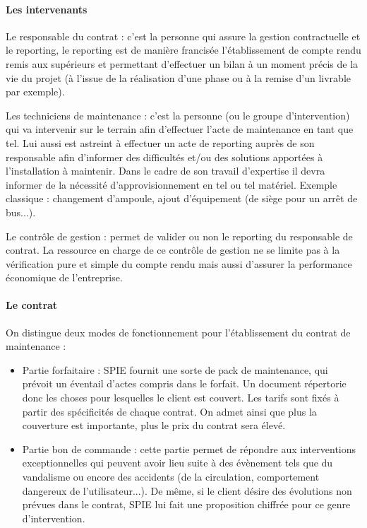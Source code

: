 \paragraph{Les intervenants}
\item Le responsable du contrat : c’est la personne qui assure la gestion contractuelle et le reporting, le reporting est de manière francisée l’établissement de compte rendu remis aux supérieurs et permettant d’effectuer un bilan à un moment précis de la vie du projet (à l’issue de la réalisation d’une phase ou à la remise d’un livrable par exemple).
\item Les techniciens de maintenance : c’est la personne (ou le groupe d’intervention) qui va intervenir sur le terrain afin d'effectuer l’acte de maintenance en tant que tel. Lui aussi est astreint à effectuer un acte de reporting auprès de son responsable afin d’informer des difficultés et/ou des solutions apportées à l’installation à maintenir. Dans le cadre de son travail d’expertise il devra informer de la nécessité d’approvisionnement en tel ou tel matériel. Exemple classique : changement d’ampoule, ajout d'équipement (de siège pour un arrêt de bus...).
\item Le contrôle de gestion : permet de valider ou non le reporting du responsable de contrat. La ressource en charge de ce contrôle de gestion ne se limite pas à la vérification pure et simple du compte rendu mais aussi d’assurer la performance économique de l’entreprise.

\paragraph{Le contrat}

On distingue deux modes de fonctionnement pour l’établissement du contrat de maintenance :

\begin{itemize}
\item Partie forfaitaire : SPIE fournit une sorte de pack de maintenance, qui prévoit un éventail d’actes compris dans le forfait. Un document répertorie donc les choses pour lesquelles le client est couvert. Les tarifs sont fixés à partir des spécificités de chaque contrat. On admet ainsi que plus la couverture est importante, plus le prix du contrat sera élevé. 
\item Partie bon de commande : cette partie permet de répondre aux interventions exceptionnelles qui peuvent avoir lieu suite à des évènement tels que du vandalisme ou encore des accidents (de la circulation, comportement dangereux de l’utilisateur...). De même, si le client désire des évolutions non prévues dans le contrat, SPIE lui fait une proposition chiffrée pour ce genre d’intervention.
\end{itemize}

